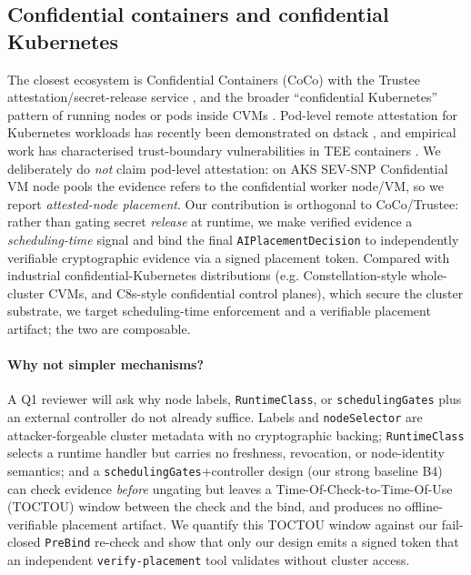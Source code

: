 \subsection{Confidential containers and confidential Kubernetes}
The closest ecosystem is Confidential Containers (CoCo) with the Trustee
attestation/secret-release service \cite{coco2024}, and the broader
``confidential Kubernetes'' pattern of running nodes or pods inside CVMs
\cite{k8s2023confidential}. Pod-level remote attestation for Kubernetes
workloads has recently been demonstrated on dstack \cite{yang2026dstack}, and
empirical work has characterised trust-boundary vulnerabilities in TEE
containers \cite{liu2025teecontainers}. We deliberately do \emph{not} claim
pod-level attestation: on AKS SEV-SNP Confidential VM node pools the evidence
refers to the confidential worker node/VM, so we report \emph{attested-node
placement}. Our contribution is orthogonal to CoCo/Trustee: rather than
gating secret \emph{release} at runtime, we make verified evidence a
\emph{scheduling-time} signal and bind the final \texttt{AIPlacementDecision} to
independently verifiable cryptographic evidence via a signed placement token.
Compared with industrial confidential-Kubernetes distributions (e.g.
Constellation-style whole-cluster CVMs, and C8s-style confidential control
planes), which secure the cluster substrate, we target scheduling-time
enforcement and a verifiable placement artifact; the two are composable.

\paragraph{Why not simpler mechanisms?}
A Q1 reviewer will ask why node labels, \texttt{RuntimeClass}, or
\texttt{schedulingGates} plus an external controller do not already suffice.
Labels and \texttt{nodeSelector} are attacker-forgeable cluster metadata with no
cryptographic backing; \texttt{RuntimeClass} selects a runtime handler but
carries no freshness, revocation, or node-identity semantics; and a
\texttt{schedulingGates}+controller design (our strong baseline B4) can check
evidence \emph{before} ungating but leaves a Time-Of-Check-to-Time-Of-Use
(TOCTOU) window between the check and the bind, and produces no offline-verifiable
placement artifact. We quantify this TOCTOU window against our fail-closed
\texttt{PreBind} re-check and show that only our design emits a signed token that
an independent \texttt{verify-placement} tool validates without cluster access.

